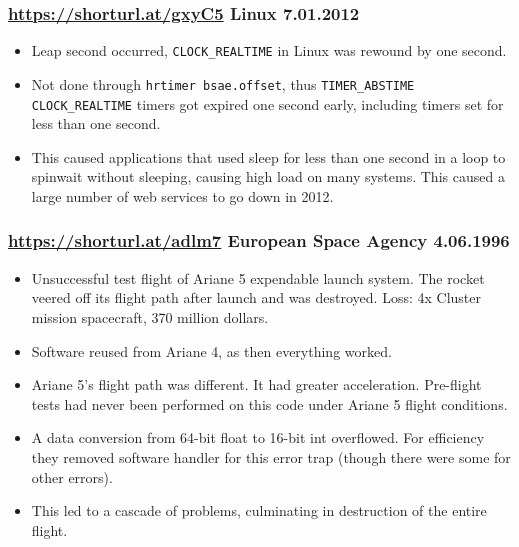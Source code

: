 \documentclass[handout]{beamer}
\begin{document}
 \begin{frame}
	 \frametitle{
		 \href{https://shorturl.at/gxyC5}{https://shorturl.at/gxyC5}
		 Linux
		 7.01.2012
	 }
	 \begin{itemize}
		 \item Leap second occurred, \texttt{CLOCK\_REALTIME} in Linux was rewound by one second. \pause
		 \item Not done through \texttt{hrtimer bsae.offset}, thus \texttt{TIMER\_ABSTIME} 
			 \texttt{CLOCK\_REALTIME} timers got expired one second early,
			 including timers set for less than one second. \pause
		 \item This caused applications that used sleep for less than one second in a loop 
			 to spinwait without sleeping, causing high load on many systems. 
			 This caused a large number of web services to go down in 2012.
	 \end{itemize}
 \end{frame}

 \begin{frame}
	 \frametitle{
		 \href{https://shorturl.at/adlm7}{https://shorturl.at/adlm7}
		 European Space Agency
		 4.06.1996
	 }
	 \begin{itemize}
		 \item Unsuccessful test flight of Ariane 5 expendable launch system. The rocket veered off its flight path after launch and was destroyed. Loss: 4x Cluster mission spacecraft, 370 million dollars. \pause
		 \item Software reused from Ariane 4, as then everything worked. \pause
		 \item Ariane 5's flight path was different. It had greater acceleration.
			 Pre-flight tests had never been performed on this code under Ariane 5 flight conditions. \pause
		 \item A data conversion from 64-bit float to 16-bit int
			 overflowed. For efficiency they removed software handler for this error trap
			 (though there were some for other errors). \pause
		 \item This led to a cascade of problems, culminating in destruction of the entire flight.
	 \end{itemize}
 \end{frame}
\end{document}

